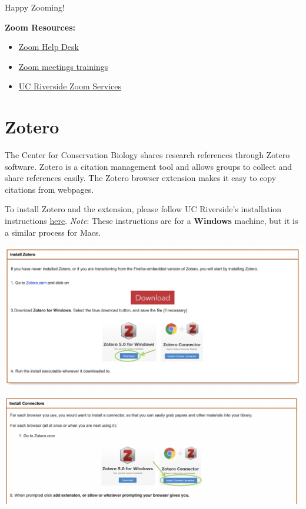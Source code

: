 \documentclass[
]{book}
\providecommand{\tightlist}{%
  \setlength{\itemsep}{0pt}\setlength{\parskip}{0pt}}
\begin{document}
Happy Zooming!

\textbf{Zoom Resources:}

\begin{itemize}
\tightlist
\item
  \href{https://support.zoom.us/hc/en-us}{Zoom Help Desk}
\item
  \href{https://livetraining.zoom.us/rec/play/6Zx8f-j7qDw3GNeQswSDAPJ-W9S4J6qshiYfqfcNyk20WyIHNFChb7pHZuClKrDVR76R1BxgtMF4txaS?continueMode=true}{Zoom meetings trainings}
\item
  \href{https://ucr.zoom.us/}{UC Riverside Zoom Services}
\end{itemize}

\hypertarget{zotero}{%
\section{Zotero}\label{zotero}}

The Center for Conservation Biology shares research references through Zotero software. Zotero is a citation management tool and allows groups to collect and share references easily. The Zotero browser extension makes it easy to copy citations from webpages.

To install Zotero and the extension, please follow UC Riverside's installation instructions \href{https://guides.lib.ucr.edu/c.php?g=171064}{here}. \emph{Note}: These instructions are for a \textbf{Windows} machine, but it is a similar process for Macs.

\begin{center}\includegraphics{images/zoteroinstall} \end{center}

\begin{center}\includegraphics{images/zoteroextension} \end{center}
\end{document}
